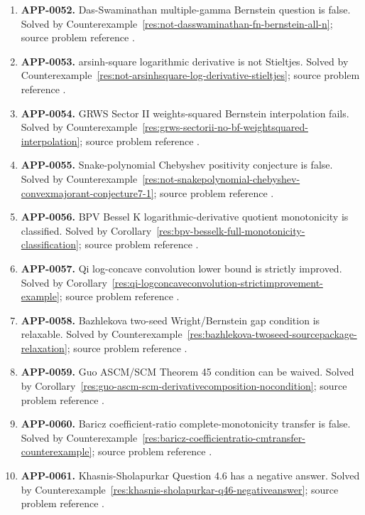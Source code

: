 \documentclass[11pt]{article}
\numberwithin{equation}{section}
\theoremstyle{definition}
\theoremstyle{remark}
\newcommand{\1}{\mathbf 1}
\begin{document}
\begin{enumerate}
\item \label{ledger:app-0052}\textbf{APP-0052.} Das-Swaminathan multiple-gamma Bernstein question is false. Solved by Counterexample~\ref{res:not-dasswaminathan-fn-bernstein-all-n}; source problem reference \cite{app-app-0052-source}.
\item \label{ledger:app-0053}\textbf{APP-0053.} arsinh-square logarithmic derivative is not Stieltjes. Solved by Counterexample~\ref{res:not-arsinhsquare-log-derivative-stieltjes}; source problem reference \cite{app-app-0053-source}.
\item \label{ledger:app-0054}\textbf{APP-0054.} GRWS Sector II weights-squared Bernstein interpolation fails. Solved by Counterexample~\ref{res:grws-sectorii-no-bf-weightsquared-interpolation}; source problem reference \cite{app-app-0054-source}.
\item \label{ledger:app-0055}\textbf{APP-0055.} Snake-polynomial Chebyshev positivity conjecture is false. Solved by Counterexample~\ref{res:not-snakepolynomial-chebyshev-convexmajorant-conjecture7-1}; source problem reference \cite{app-app-0055-source}.
\item \label{ledger:app-0056}\textbf{APP-0056.} BPV Bessel K logarithmic-derivative quotient monotonicity is classified. Solved by Corollary~\ref{res:bpv-besselk-full-monotonicity-classification}; source problem reference \cite{app-app-0056-source}.
\item \label{ledger:app-0057}\textbf{APP-0057.} Qi log-concave convolution lower bound is strictly improved. Solved by Corollary~\ref{res:qi-logconcaveconvolution-strictimprovement-example}; source problem reference \cite{qi-hlambda}.
\item \label{ledger:app-0058}\textbf{APP-0058.} Bazhlekova two-seed Wright/Bernstein gap condition is relaxable. Solved by Counterexample~\ref{res:bazhlekova-twoseed-sourcepackage-relaxation}; source problem reference \cite{app-app-0058-source}.
\item \label{ledger:app-0059}\textbf{APP-0059.} Guo ASCM/SCM Theorem 45 condition can be waived. Solved by Corollary~\ref{res:guo-ascm-scm-derivativecomposition-nocondition}; source problem reference \cite{app-app-0059-source}.
\item \label{ledger:app-0060}\textbf{APP-0060.} Baricz coefficient-ratio complete-monotonicity transfer is false. Solved by Counterexample~\ref{res:baricz-coefficientratio-cmtransfer-counterexample}; source problem reference \cite{app-app-0060-source}.
\item \label{ledger:app-0061}\textbf{APP-0061.} Khasnis-Sholapurkar Question 4.6 has a negative answer. Solved by Counterexample~\ref{res:khasnis-sholapurkar-q46-negativeanswer}; source problem reference \cite{app-app-0061-source}.

\end{enumerate}
\end{document}
